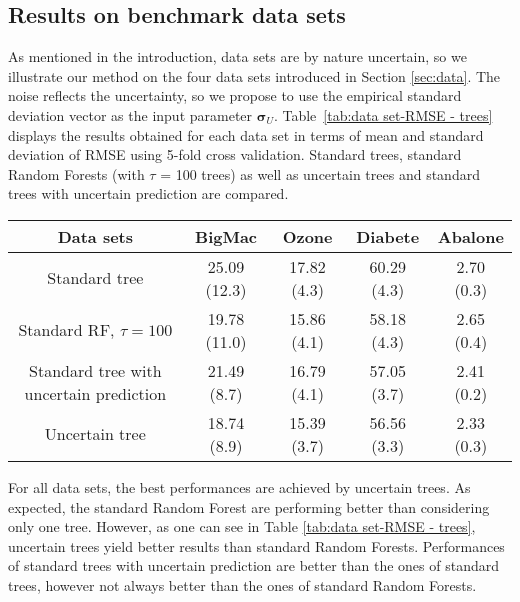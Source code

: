 \documentclass[twoside,11pt]{article}
\begin{document}
\subsection{Results on benchmark data sets}
\label{sec:bench}
As mentioned in the introduction, data sets are by nature uncertain, so we illustrate our method on the four data sets introduced in Section \ref{sec:data}. 
The noise reflects the uncertainty, so we propose to use the empirical standard deviation vector as the input parameter $\boldsymbol{\sigma}_U$. Table~\ref{tab:data set-RMSE - trees} displays the results obtained for each data set in terms of mean and standard deviation of RMSE using 5-fold cross validation.
Standard trees, standard Random Forests (with $\tau$ = 100 trees) as well as uncertain trees and standard trees with uncertain prediction are compared.

\begin{table*}[ht!]
  \centering
      \begin{tabular}{ccccc}
         Data sets & {BigMac}& {Ozone} & {Diabete}   & {Abalone}  \\
        \hline
        \hline
         Standard tree  & 25.09 (12.3) & 17.82 (4.3) & 60.29 (4.3) & 2.70 (0.3) \\
         Standard RF, $\tau = 100$ & 19.78 (11.0) & 15.86 (4.1) & 58.18 (4.3) & 2.65 (0.4) \\
        Standard tree with uncertain prediction  & 21.49 (8.7) & 16.79 (4.1) & 57.05 (3.7)&  2.41 (0.2) \\
        Uncertain tree & 18.74 (8.9) & 15.39 (3.7) & 56.56 (3.3) &  2.33 (0.3)  \\
        \hline
      \end{tabular}
\caption{Average RMSE based on 5-fold cross-validation for the 4 benchmark data sets. Standard deviations are given in parentheses. For each  uncertain tree based method, $\boldsymbol{\sigma}_{U}$ are set to the empirical standard deviations of the observed input variables.}
\label{tab:data set-RMSE - trees}
\end{table*}

For all data sets, the best performances are achieved by uncertain trees.
As expected, the standard Random Forest are performing better than considering only one tree. However, as one can see in Table \ref{tab:data set-RMSE - trees}, uncertain trees yield better results than standard Random Forests. Performances of standard trees with uncertain prediction are better than the ones of standard trees, however not always better than the ones of standard Random Forests.
\end{document}
